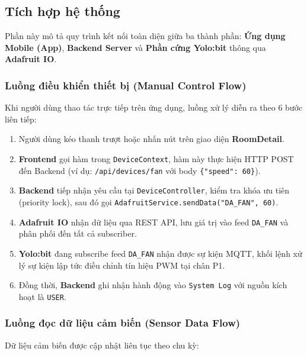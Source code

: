 \subsection{Tích hợp hệ thống}

Phần này mô tả quy trình kết nối toàn diện giữa ba thành phần: \textbf{Ứng dụng Mobile (App)}, \textbf{Backend Server} và \textbf{Phần cứng Yolo:bit} thông qua \textbf{Adafruit IO}.

\subsubsection{Luồng điều khiển thiết bị (Manual Control Flow)}

Khi người dùng thao tác trực tiếp trên ứng dụng, luồng xử lý diễn ra theo 6 bước liên tiếp:

\begin{enumerate}
    \item Người dùng kéo thanh trượt hoặc nhấn nút trên giao diện \textbf{RoomDetail}.
    \item \textbf{Frontend} gọi hàm trong \texttt{DeviceContext}, hàm này thực hiện HTTP POST đến Backend (ví dụ: \texttt{/api/devices/fan} với body \texttt{\{"speed": 60\}}).
    \item \textbf{Backend} tiếp nhận yêu cầu tại \texttt{DeviceController}, kiểm tra khóa ưu tiên (priority lock), sau đó gọi \texttt{AdafruitService.sendData("DA\_FAN", 60)}.
    \item \textbf{Adafruit IO} nhận dữ liệu qua REST API, lưu giá trị vào feed \texttt{DA\_FAN} và phân phối đến tất cả subscriber.
    \item \textbf{Yolo:bit} đang subscribe feed \texttt{DA\_FAN} nhận được sự kiện MQTT, khối lệnh xử lý sự kiện lập tức điều chỉnh tín hiệu PWM tại chân P1.
    \item Đồng thời, \textbf{Backend} ghi nhận hành động vào \texttt{System Log} với nguồn kích hoạt là \texttt{USER}.
\end{enumerate}

\subsubsection{Luồng đọc dữ liệu cảm biến (Sensor Data Flow)}

Dữ liệu cảm biến được cập nhật liên tục theo chu kỳ:

